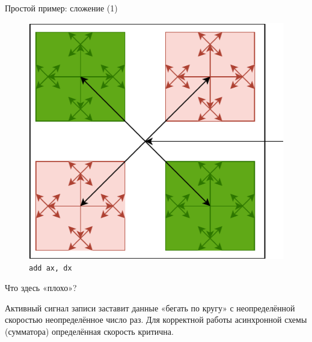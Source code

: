 \documentclass[xetex,aspectratio=43]{beamer}
\begin{document}
\begin{frame}[fragile]{Простой пример: сложение (1)}
    \begin{figure}
        \includegraphics[height=0.4\textheight,page=3]{img/05.clocks.drawio-crop.pdf}
        \caption{\texttt{add ax, dx}}
    \end{figure}
    Что здесь «плохо»?
    \pause

    Активный сигнал записи заставит данные «бегать по кругу» с неопределённой скоростью неопределённое число раз. Для корректной работы асинхронной схемы (сумматора) определённая скорость критична.
\end{frame}
\end{document}
